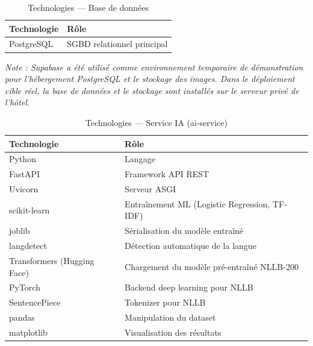 \begin{table}[H]
\centering
\caption{Technologies — Base de données}
\label{tab:tech_db}
\begin{tabular}{|l|p{10cm}|}
\hline
\textbf{Technologie} & \textbf{Rôle} \\
\hline
PostgreSQL & SGBD relationnel principal \\
\hline
\end{tabular}
\end{table}

\noindent\textit{Note : Supabase a été utilisé comme environnement temporaire de démonstration pour l'hébergement PostgreSQL et le stockage des images. Dans le déploiement cible réel, la base de données et le stockage sont installés sur le serveur privé de l'hôtel.}

\begin{table}[H]
\centering
\caption{Technologies — Service IA (ai-service)}
\label{tab:tech_ia}
\begin{tabular}{|l|p{10cm}|}
\hline
\textbf{Technologie} & \textbf{Rôle} \\
\hline
Python & Langage \\
\hline
FastAPI & Framework API REST \\
\hline
Uvicorn & Serveur ASGI \\
\hline
scikit-learn & Entraînement ML (Logistic Regression, TF-IDF) \\
\hline
joblib & Sérialisation du modèle entraîné \\
\hline
langdetect & Détection automatique de la langue \\
\hline
Transformers (Hugging Face) & Chargement du modèle pré-entraîné NLLB-200 \\
\hline
PyTorch & Backend deep learning pour NLLB \\
\hline
SentencePiece & Tokenizer pour NLLB \\
\hline
pandas & Manipulation du dataset \\
\hline
matplotlib & Visualisation des résultats \\
\hline
\end{tabular}
\end{table}


